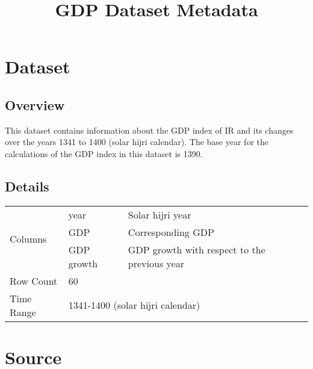 \documentclass[fleqn]{report}
\begin{document}
\pagestyle{fancy}
\fancyhf{}

\title{GDP Dataset Metadata}
\date{}
\maketitle

\newpage

\chapter*{Dataset}
\section*{Overview}
This dataset contains information about the GDP index of IR and its changes over the years 1341 to 1400 (solar hijri calendar). The base year for the calculations of the GDP index in this dataset is 1390.
\section*{Details}
\begin{center}
    \begin{tabular}{|l|ll|}
        \hline
        \multirow{3}{*}{Columns} & \multicolumn{1}{l|}{year}       & Solar hijri year                             \\ \cline{2-3} 
                                 & \multicolumn{1}{l|}{GDP}        & Corresponding GDP                            \\ \cline{2-3} 
                                 & \multicolumn{1}{l|}{GDP growth} & GDP growth with respect to the previous year \\ \hline
        Row Count                & \multicolumn{2}{l|}{60}                                                        \\ \hline
        Time Range               & \multicolumn{2}{l|}{1341-1400  (solar hijri calendar)}                             \\ \hline
    \end{tabular}
\end{center}

\chapter*{Source}
\end{document}
